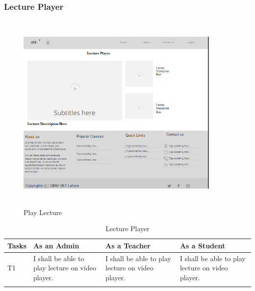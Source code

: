 \documentclass[12pt]{article}
\begin{document}
\subsubsection{Lecture Player}
\begin{figure}[H]
  \centering
  \includegraphics[width=10cm, height=10cm]{LecturePlayer}
  \caption{Play Lecture}
\end{figure}
\newpage
\begin{longtable}{|p{2cm}|p{4cm}|p{4cm}|p{4cm}|}
\hline
\textbf{Tasks} & \textbf{As an Admin} & \textbf{As a Teacher} & \textbf{As a Student}\\
\hline
T1 &
I shall be able to play lecture on video player. &
I shall be able to play lecture on video player. &
I shall be able to play lecture on video player.
\\
\hline
\caption{Lecture Player}
\end{longtable}
%
%
%
\end{document}
